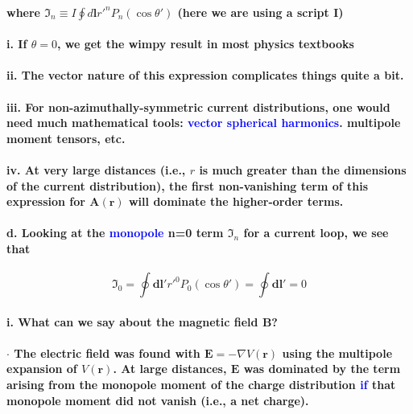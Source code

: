 \documentclass{article}
\begin{document}
\paragraph{where $\mathfrak{I}_n\equiv I\oint d\boldsymbol{l}r'^nP_n(\cos\theta')$ (here we are using a script I)}
\paragraph{\indent i. If $\theta=0$, we get the wimpy result in most physics textbooks}
\paragraph{\indent ii. The vector nature of this expression complicates things quite a bit.}
\paragraph{\indent iii. For non-azimuthally-symmetric current distributions, one would need much mathematical tools: \textcolor{blue}{vector spherical harmonics}. multipole moment tensors, etc.}
\paragraph{\indent iv. At very large distances (i.e., $r$ is much greater than the dimensions of the current distribution), the first non-vanishing term of this expression for $\boldsymbol{A}(\boldsymbol{r})$ will dominate the higher-order terms.}
\paragraph{\indent d. Looking at the \textcolor{blue}{monopole} n=0 term $\mathfrak{I}_n$ for a current loop, we see that}
\begin{equation*}
    \mathfrak{I}_0=\oint\boldsymbol{dl}'r'^0P_0(\cos\theta')=\oint\boldsymbol{dl}'=0
\end{equation*}
\paragraph{\indent i. What can we say about the magnetic field $\boldsymbol{B}$?}
\paragraph{\indent $\cdot$ The electric field was found with $\boldsymbol{E}=-\nabla V(\boldsymbol{r})$ using the multipole expansion of $V(\boldsymbol{r})$. At large distances, $\boldsymbol{E}$ was dominated by the term arising from the monopole moment of the charge distribution \textcolor{blue}{if} that monopole moment did not vanish (i.e., a net charge).}
\end{document}
